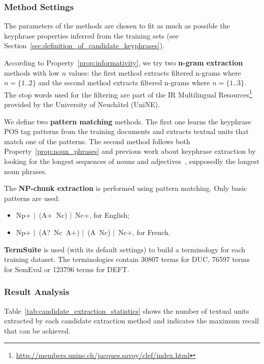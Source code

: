     \subsubsection{Method Settings}
    \label{subsubsec:method_settings}
      The parameters of the methods are chosen to fit as much as possible the
      keyphrase properties inferred from the training sets (see
      Section~\ref{sec:definition_of_candidate_keyphrases}).

      According to Property~\ref{prop:informativity}, we try two \textbf{n-gram
      extraction} methods with low $n$ values: the first method extracts
      filtered n-grams where $n = \{1..2\}$ and the second method extracts
      filtered n-grams where $n = \{1..3\}$. The stop words used for the
      filtering are part of the IR Multilingual
      Resources\footnote{\url{http://members.unine.ch/jacques.savoy/clef/index.html}}
      provided by the University of Neuchâtel (UniNE).

      We define two \textbf{pattern matching} methods. The first one learns the
      keyphrase POS tag patterns from the training documents and extracts
      textual units that match one of the patterns. The second method follows
      both Property~\ref{prop:noun_phrases} and previous work about keyphrase
      extraction by looking for the longest sequences of nouns and
      adjectives~\cite{wan2008expandrank,hassan2010conundrums}, supposedly the
      longest noun phrases.

      The \textbf{NP-chunk extraction} is performed using pattern matching. Only
      basic patterns are used:
      \begin{itemize}
        \item{Np+ $|$~(A+~Nc) $|$~Nc+, for English;}
        \item{Np+ $|$~(A?~Nc~A+) $|$~(A~Nc) $|$~Nc+, for French.}
      \end{itemize}


      \textbf{TermSuite} is used (with its default settings) to build a
      terminology for each training dataset. The terminologies contain 30807
      terms for DUC, 76597 terms for SemEval or 123796 terms for DEFT.

    \subsubsection{Result Analysis}
    \label{subsubsec:candidate_extraction_result_analysis}
      Table~\ref{tab:candidate_extraction_statistics} shows the number of
      textual units extracted by each candidate extraction method and indicates
      the maximum recall that can be achieved.

